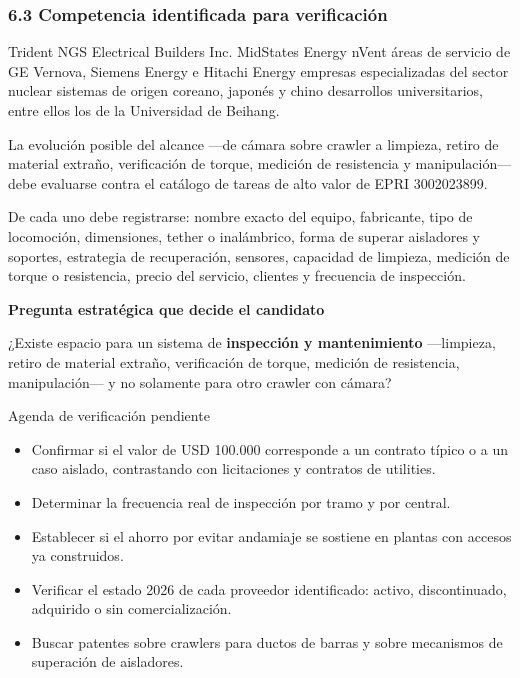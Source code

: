 \documentclass[11pt,a4paper]{article}
\newenvironment{notaclave}[1]
  {\begin{notaclavebase}{\sffamily\scriptsize\bfseries\color{amber}#1}\par\vspace{2pt}}
  {\end{notaclavebase}}
\newenvironment{detalle}[1]{\begin{detallebase}{#1}}{\end{detallebase}}
\begin{document}
\subsubsection*{6.3 Competencia identificada para verificación}

Trident NGS \textperiodcentered{} Electrical Builders Inc. \textperiodcentered{} MidStates Energy \textperiodcentered{} nVent \textperiodcentered{} áreas de servicio de GE Vernova, Siemens Energy e Hitachi Energy \textperiodcentered{} empresas especializadas del sector nuclear \textperiodcentered{} sistemas de origen coreano, japonés y chino \textperiodcentered{} desarrollos universitarios, entre ellos los de la Universidad de Beihang.

La evolución posible del alcance —de cámara sobre crawler a limpieza, retiro de material extraño, verificación de torque, medición de resistencia y manipulación— debe evaluarse contra el catálogo de tareas de alto valor de EPRI 3002023899.

De cada uno debe registrarse: nombre exacto del equipo, fabricante, tipo de locomoción, dimensiones, tether o inalámbrico, forma de superar aisladores y soportes, estrategia de recuperación, sensores, capacidad de limpieza, medición de torque o resistencia, precio del servicio, clientes y frecuencia de inspección.

\begin{notaclave}{Pregunta estratégica que decide el candidato}
¿Existe espacio para un sistema de \textbf{inspección y mantenimiento} —limpieza, retiro de material extraño, verificación de torque, medición de resistencia, manipulación— y no solamente para otro crawler con cámara?

\end{notaclave}
\begin{detalle}{Agenda de verificación pendiente}
\begin{itemize}
\item Confirmar si el valor de USD 100.000 corresponde a un contrato típico o a un caso aislado, contrastando con licitaciones y contratos de utilities.
\item Determinar la frecuencia real de inspección por tramo y por central.
\item Establecer si el ahorro por evitar andamiaje se sostiene en plantas con accesos ya construidos.
\item Verificar el estado 2026 de cada proveedor identificado: activo, discontinuado, adquirido o sin comercialización.
\item Buscar patentes sobre crawlers para ductos de barras y sobre mecanismos de superación de aisladores.
\end{itemize}

\end{detalle}
\end{document}
